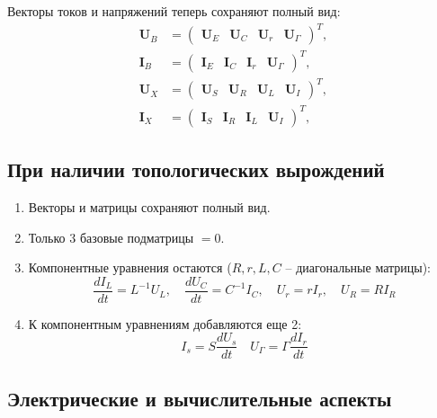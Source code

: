 	Векторы токов и напряжений теперь сохраняют полный вид:
	\begin{equation}
		\begin{aligned}
			\bm{U}_B &= \begin{pmatrix} \bm{U}_E & \bm{U}_C & \bm{U}_r & \bm{U}_\Gamma \end{pmatrix}^T, \\
			\bm{I}_B &= \begin{pmatrix} \bm{I}_E & \bm{I}_C & \bm{I}_r & \bm{U}_\Gamma \end{pmatrix}^T, \\
			\bm{U}_X &= \begin{pmatrix} \bm{U}_S & \bm{U}_R & \bm{U}_L & \bm{U}_I \end{pmatrix}^T, \\
			\bm{I}_X &= \begin{pmatrix} \bm{I}_S & \bm{I}_R & \bm{I}_L & \bm{U}_I \end{pmatrix}^T,
		\end{aligned}
	\end{equation}
	
	
	\subsection{При наличии топологичесĸих вырождений}
	
	\begin{enumerate}
		\item Векторы и матрицы сохраняют полный вид.
		\item Только 3 базовые подматрицы $=0$.
	
		\item Компонентные уравнения остаются ($R, r, L, C$ – диагональные матрицы):
		\begin{equation}
			\frac{d I_L}{dt} = L^{-1} U_L, \quad \frac{d U_C}{dt} = C^{-1} I_C, \quad U_r = r I_r, \quad U_R = R I_R
		\end{equation}
		\item К компонентным уравнениям добавляются еще 2:
		\begin{equation}
			I_s = S \frac{d U_s}{dt} \quad U_\Gamma = \Gamma \frac{d I_r}{dt}
		\end{equation}
	\end{enumerate}
	
	\subsection{Электрические и вычислительные аспекты}
	
